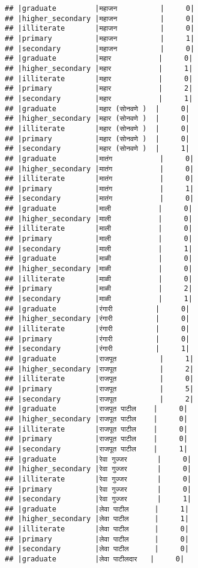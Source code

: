 \documentclass[
]{article}
\begin{document}
\begin{verbatim}
## |graduate         |महाजन          |     0|
## |higher_secondary |महाजन          |     0|
## |illiterate       |महाजन          |     0|
## |primary          |महाजन          |     1|
## |secondary        |महाजन          |     0|
## |graduate         |महार           |     0|
## |higher_secondary |महार           |     1|
## |illiterate       |महार           |     0|
## |primary          |महार           |     2|
## |secondary        |महार           |     1|
## |graduate         |महार (सोनवणे )  |     0|
## |higher_secondary |महार (सोनवणे )  |     0|
## |illiterate       |महार (सोनवणे )  |     0|
## |primary          |महार (सोनवणे )  |     0|
## |secondary        |महार (सोनवणे )  |     1|
## |graduate         |मातंग           |     0|
## |higher_secondary |मातंग           |     0|
## |illiterate       |मातंग           |     0|
## |primary          |मातंग           |     1|
## |secondary        |मातंग           |     0|
## |graduate         |माली           |     0|
## |higher_secondary |माली           |     0|
## |illiterate       |माली           |     0|
## |primary          |माली           |     0|
## |secondary        |माली           |     1|
## |graduate         |माळी           |     0|
## |higher_secondary |माळी           |     0|
## |illiterate       |माळी           |     0|
## |primary          |माळी           |     2|
## |secondary        |माळी           |     1|
## |graduate         |रंगारी          |     0|
## |higher_secondary |रंगारी          |     0|
## |illiterate       |रंगारी          |     0|
## |primary          |रंगारी          |     0|
## |secondary        |रंगारी          |     1|
## |graduate         |राजपूत          |     1|
## |higher_secondary |राजपूत          |     2|
## |illiterate       |राजपूत          |     0|
## |primary          |राजपूत          |     5|
## |secondary        |राजपूत          |     2|
## |graduate         |राजपूत पाटील    |     0|
## |higher_secondary |राजपूत पाटील    |     0|
## |illiterate       |राजपूत पाटील    |     0|
## |primary          |राजपूत पाटील    |     0|
## |secondary        |राजपूत पाटील    |     1|
## |graduate         |रेवा गुज्जर       |     0|
## |higher_secondary |रेवा गुज्जर       |     0|
## |illiterate       |रेवा गुज्जर       |     0|
## |primary          |रेवा गुज्जर       |     0|
## |secondary        |रेवा गुज्जर       |     1|
## |graduate         |लेवा पाटील      |     1|
## |higher_secondary |लेवा पाटील      |     1|
## |illiterate       |लेवा पाटील      |     0|
## |primary          |लेवा पाटील      |     0|
## |secondary        |लेवा पाटील      |     0|
## |graduate         |लेवा पाटीलदार   |     0|

\end{verbatim}
\end{document}
